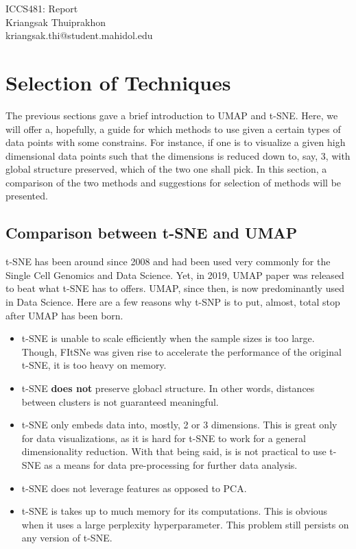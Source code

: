\documentclass[a4paper, 11pt]{article}
\makeatletter
\newcommand{\myname}{Kriangsak Thuiprakhon}
\newcommand{\myemail}{kriangsak.thi@student.mahidol.edu}
\newcommand{\myhwnum}{}
\makeatother
\begin{document}
\medskip                        %

\thispagestyle{plain}
\begin{center}                  %
{\Large ICCS481: Report \myhwnum} \\
\myname \\
\myemail \\
\end{center}

\section{Selection of Techniques}
The previous sections gave a brief introduction to UMAP and t-SNE. Here, we will offer a, hopefully, a guide for which methods to use given a certain types of data points with some constrains. For instance, if one is to visualize a given high dimensional data points such that the dimensions is reduced down to, say, 3, with global structure preserved, which of the two one shall pick. In this section, a comparison of the two methods and suggestions for selection of methods will be presented.  

\subsection{Comparison between t-SNE and UMAP}
t-SNE has been around since 2008 and had been used very commonly for the Single Cell Genomics  and Data Science. Yet, in 2019, UMAP paper was released to beat what t-SNE has to offers. UMAP, since then, is now predominantly used in Data Science. Here are a few reasons why t-SNP is to put, almost, total stop after UMAP has been born. 
\begin{itemize}
\item t-SNE is unable to scale efficiently when the sample sizes is too large. Though,  FItSNe was given rise  to accelerate the performance of the original t-SNE, it is too heavy on memory. 
\item t-SNE  \textbf{does not} preserve globacl structure. In other words, distances between clusters is not guaranteed meaningful.  
\item t-SNE only embeds data into, mostly, 2 or 3 dimensions. This is great only for data visualizations, as it is hard for t-SNE to work for a general dimensionality reduction. With that being said, is is not practical to use t-SNE as a means for data pre-processing for further data analysis. 
\item t-SNE does not leverage features as opposed to PCA.
\item t-SNE is takes up to much memory for its computations. This is obvious when it uses a large perplexity hyperparameter. This problem still persists on any version of t-SNE.
\end{itemize}
\end{document}
